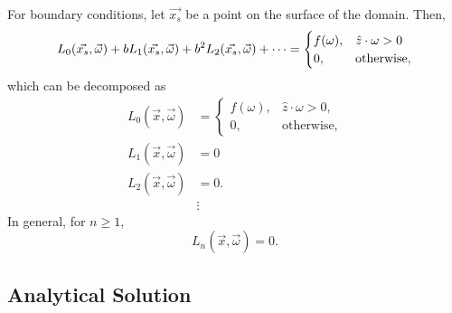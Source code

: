 For boundary conditions, let $\vec{x_s}$ be a point on the surface of the domain.
Then,
\begin{equation*}
  L_0(\vec{x_s},\vec{\omega}) + b L_1(\vec{x_s},\vec{\omega}) + b^2 L_2(\vec{x_s},\vec{\omega}) + \cdots =
  \begin{cases}
    f(\omega), & \hat{z}\cdot\omega > 0 \\
    0, & \mbox{otherwise},
  \end{cases}
\end{equation*}
which can be decomposed as
\begin{align}
  L_0(\vec{x}, \vec{\omega}) &=
  \begin{cases}
    f(\omega), & \hat{z}\cdot\omega > 0, \\
    0, & \mbox{otherwise},
  \end{cases}
  \label{eqn:asymptotics_bc_0} \\
  L_1(\vec{x}, \vec{\omega}) &= 0 \nonumber \\
  L_2(\vec{x}, \vec{\omega}) &= 0. \nonumber \\
  &\vdots \nonumber
\end{align}
In general, for $n \geq 1$,
\begin{equation}
  L_n(\vec{x}, \vec{\omega}) = 0.
  \label{eqn:asymptotics_bc_n}
\end{equation}


\subsection{Analytical Solution}
\label{sec:asymptotic_sol}


